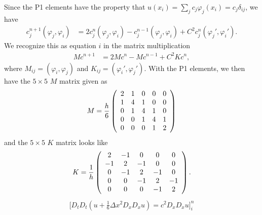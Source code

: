 \documentclass[a4paper,10pt]{article}
\renewcommand{\(}{\left(}
\renewcommand{\)}{\right)}
\newcommand{\f}[2]{\frac{#1}{#2}}
\begin{document}
Since the P1 elements have the property that $u(x_i) = \sum_j c_j \varphi_j(x_i) = c_j\delta_{ij}$, we have
\begin{align*}
  c_j^{n+1}(\varphi_j,\varphi_i) &= 2c_j^n(\varphi_j,\varphi_i) - c_j^{n-1}(\varphi_j,\varphi_i) + C^2c_j^n(\varphi_j',\varphi_i').
\end{align*}
We recognize this as equation $i$ in the matrix multiplication
\begin{align*}
  Mc^{n+1} &= 2Mc^n - Mc^{n-1} + C^2Kc^n,
\end{align*}
where $M_{ij} = (\varphi_i,\varphi_j)$ and $K_{ij} = (\varphi_i',\varphi_j')$. With the P1 elements, we then have the $5\times5$ $M$ matrix given as
\begin{align*}
  M = \frac{h}{6}\left(
  \begin{array}{c c c c c}
  2 & 1 & 0 & 0 & 0\\
  1 & 4 & 1 & 0 & 0\\
  0 & 1 & 4 & 1 & 0\\
  0 & 0 & 1 & 4 & 1\\
  0 & 0 & 0 & 1 & 2
  \end{array}
  \right)
\end{align*}
and the $5\times5$ $K$ matrix looks like
\begin{align*}
  K = \frac{1}{h}\left(
  \begin{array}{c c c c c}
  2 & -1 & 0 & 0 & 0\\
  -1 & 2 & -1 & 0 & 0\\
  0 & -1 & 2 & -1 & 0\\
  0 & 0 & -1 & 2 & -1\\
  0 & 0 & 0 & -1 & 2
  \end{array}
  \right).
\end{align*}
\begin{align}
  \label{eq:weirdscheme}
  \Big[D_tD_t(u + \f{1}{6}\Delta x^2 D_xD_xu) = c^2D_xD_xu\Big]^n_i
\end{align}
\end{document}
